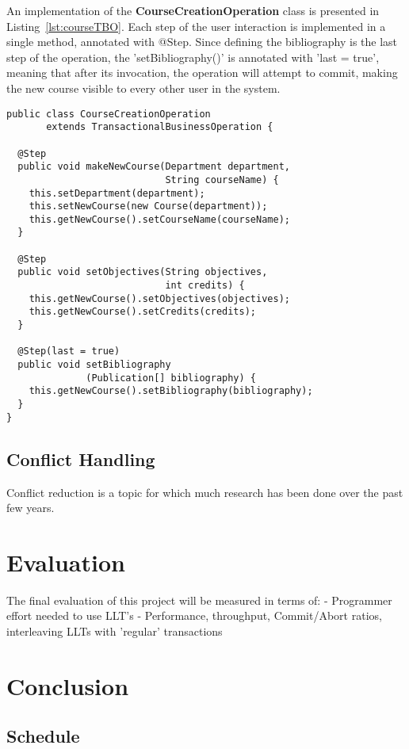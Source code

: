 \documentclass{llncs}
\begin{document}
An implementation of the {\bf CourseCreationOperation} class is
presented in Listing~\ref{lst:courseTBO}. Each step of the user
interaction is implemented in a single method, annotated with
@Step. Since defining the bibliography is the last step of the
operation, the 'setBibliography()' is annotated with 'last = true',
meaning that after its invocation, the operation will attempt to
commit, making the new course visible to every other user in the
system.

\begin{lstlisting}
public class CourseCreationOperation 
       extends TransactionalBusinessOperation {    

  @Step
  public void makeNewCourse(Department department,
                            String courseName) {
    this.setDepartment(department);
    this.setNewCourse(new Course(department));
    this.getNewCourse().setCourseName(courseName);
  }

  @Step
  public void setObjectives(String objectives,
                            int credits) {
    this.getNewCourse().setObjectives(objectives);
    this.getNewCourse().setCredits(credits);
  }

  @Step(last = true)
  public void setBibliography
              (Publication[] bibliography) {
    this.getNewCourse().setBibliography(bibliography);
  }
}
\end{lstlisting}

\subsection{Conflict Handling}

Conflict reduction is a topic for which much research has been done
over the past few years.

\section{Evaluation}

The final evaluation of this project will be measured in terms of: -
Programmer effort needed to use LLT's - Performance, throughput,
Commit/Abort ratios, interleaving LLTs with 'regular' transactions

\section{Conclusion}

\subsection{Schedule}

 
\end{document}
